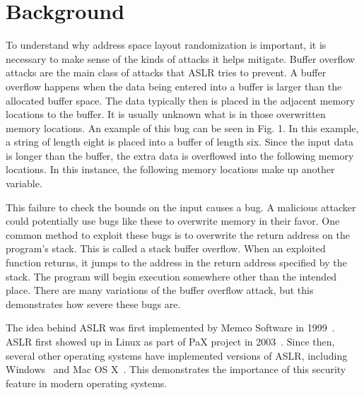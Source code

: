\section{Background}
\label{s:background} %

To understand why address space layout randomization is important, it is necessary to make sense of the kinds of attacks it helps mitigate. Buffer overflow attacks are the main class of attacks that ASLR tries to prevent. A buffer overflow happens when the data being entered into a buffer is larger than the allocated buffer space. The data typically then is placed in the adjacent memory locations to the buffer. It is usually unknown what is in those overwritten memory locations. An example of this bug can be seen in Fig. 1. In this example, a string of length eight is placed into a buffer of length six. Since the input data is longer than the buffer, the extra data is overflowed into the following memory locations. In this instance, the following memory locations make up another variable.

This failure to check the bounds on the input causes a bug. A malicious attacker could potentially use bugs like these to overwrite memory in their favor. One common method to exploit these bugs is to overwrite the return address on the program’s stack. This is called a stack buffer overflow. When an exploited function returns, it jumps to the address in the return address specified by the stack. The program will begin execution somewhere other than the intended place. There are many variations of the buffer overflow attack, but this demonstrates how severe these bugs are.

The idea behind ASLR was first implemented by Memco Software in 1999~\cite{yarom1999method}. ASLR first showed up in Linux as part of PaX project in 2003~\cite{paxdocs}. Since then, several other operating systems have implemented versions of ASLR, including Windows~\cite{msexploitmitigation} and Mac OS X~\cite{applesecurity}. This demonstrates the importance of this security feature in modern operating systems.

